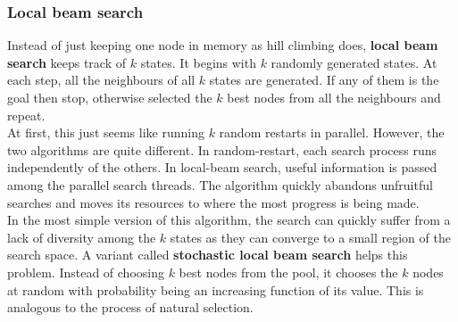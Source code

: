\documentclass{article}
\newcommand{\n}[0]{\\[\baselineskip]}
\begin{document}
\subsubsection{Local beam search}
Instead of just keeping one node in memory as hill climbing does, \textbf{local beam search} keeps track of $k$ states. It begins with $k$ randomly generated states. At each step, all the neighbours of all $k$ states are generated. If any of them is the goal then stop, otherwise selected the $k$ best nodes from all the neighbours and repeat.
\n
At first, this just seems like running $k$ random restarts in parallel. However, the two algorithms are quite different. In random-restart, each search process runs independently of the others. In local-beam search, useful information is passed among the parallel search threads. The algorithm quickly abandons unfruitful searches and moves its resources to where the most progress is being made.
\n
In the most simple version of this algorithm, the search can quickly suffer from a lack of diversity among the $k$ states as they can converge to a small region of the search space. A variant called \textbf{stochastic local beam search} helps this problem. Instead of choosing $k$ best nodes from the pool, it chooses the $k$ nodes at random with probability being an increasing function of its value. This is analogous to the process of natural selection. 
\end{document}
